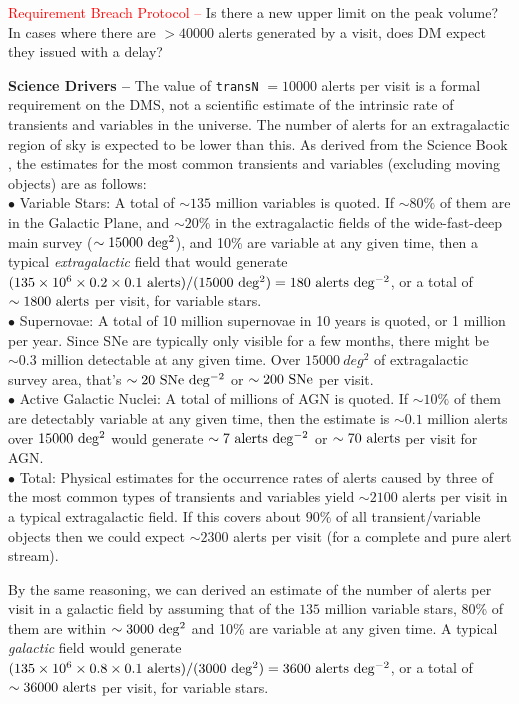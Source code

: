 \documentclass[DM,authoryear,toc]{lsstdoc}
\begin{document}
\textcolor{red}{Requirement Breach Protocol --} Is there a new upper limit on the peak volume? In cases where there are $>40000$ alerts generated by a visit, does DM expect they issued with a delay?

{\bf Science Drivers --} The value of {\tt transN} $=10000$ alerts per visit is a formal requirement on the DMS, not a scientific estimate of the intrinsic rate of transients and variables in the universe. The number of alerts for an extragalactic region of sky is expected to be lower than this. As derived from the Science Book \citep{2009arXiv0912.0201L}, the estimates for the most common transients and variables (excluding moving objects) are as follows: \\
$\bullet$ Variable Stars: A total of $\sim135$ million variables is quoted. If $\sim80\%$ of them are in the Galactic Plane, and $\sim20\%$ in the extragalactic fields of the wide-fast-deep main survey ($\sim15000\ {\rm deg^2}$), and 10\% are variable at any given time, then a typical {\it extragalactic} field that would generate $(135\times 10^6 \times 0.2 \times 0.1\ {\rm alerts}) / (15000\ {\rm deg^2}) = 180 \ {\rm alerts\ deg^{-2}}$, or a total of $\sim1800\ {\rm alerts}$ per visit, for variable stars. \\
$\bullet$ Supernovae: A total of 10 million supernovae in 10 years is quoted, or 1 million per year. Since SNe are typically only visible for a few months, there might be $\sim0.3$ million detectable at any given time. Over $15000\ deg^{2}$ of extragalactic survey area, that's $\sim20\ {\rm SNe\ deg^{-2}}$ or $\sim200\ {\rm SNe}$ per visit. \\
$\bullet$ Active Galactic Nuclei: A total of millions of AGN is quoted. If $\sim10\%$ of them are detectably variable at any given time, then the estimate is $\sim0.1$ million alerts over $15000\ {\rm deg^2}$ would generate $\sim7\ {\rm alerts\ deg^{-2}}$ or $\sim70\ {\rm alerts}$ per visit for AGN. \\
$\bullet$ Total: Physical estimates for the occurrence rates of alerts caused by three of the most common types of transients and variables yield $\sim 2100$ alerts per visit in a typical extragalactic field. If this covers about $90\%$ of all transient/variable objects then we could expect $\sim 2300$ alerts per visit (for a complete and pure alert stream).

By the same reasoning, we can derived an estimate of the number of alerts per visit in a galactic field by assuming that of the $135$ million variable stars, 80\% of them are within $\sim3000\ {\rm deg^2}$ and 10\% are variable at any given time. A typical {\it galactic} field would generate $(135\times 10^6 \times 0.8 \times 0.1\ {\rm alerts}) / (3000\ {\rm deg^2}) = 3600 \ {\rm alerts\ deg^{-2}}$, or a total of $\sim36000\ {\rm alerts}$ per visit, for variable stars.
\end{document}
